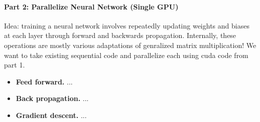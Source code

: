 \documentclass[12pt,letterpaper,twoside]{article}
\begin{document}
\paragraph{Part 2: Parallelize Neural Network (Single GPU)} Idea: training a neural
network involves repeatedly updating weights and biases at each layer through forward
and backwards propagation. Internally, these operations are mostly various adaptations
of genralized matrix multiplication! We want to take existing sequential code and 
parallelize each using cuda code from part 1.

\begin{itemize}
    \item \textbf{Feed forward.} ...

    \item \textbf{Back propagation.} ...

    \item \textbf{Gradient descent.} ...
\end{itemize}
\end{document}
